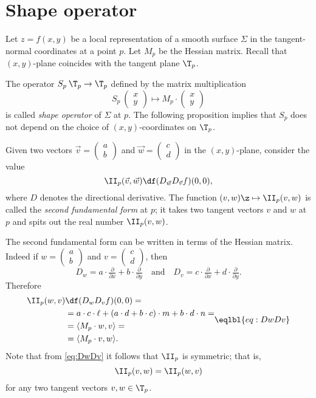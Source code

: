 \section*{Shape operator}

Let $z=f(x,y)$ be a local representation of a smooth surface $\Sigma$ in the tangent-normal coordinates at a point $p$.
Let $M_p$ be the Hessian matrix.
Recall that $(x,y)$-plane coincides with the tangent plane $\T_p$.

The operator $S_p\:\T_p\to \T_p$ defined by the matrix multiplication
\[S_p\:(\begin{smallmatrix}
x\\y
\end{smallmatrix})
\mapsto
M_p\cdot(\begin{smallmatrix}
x\\y
\end{smallmatrix})\] is called \emph{shape operator} of $\Sigma$ at $p$.
The following proposition implies that $S_p$ does not depend on the choice of $(x,y)$-coordinates on $\T_p$.





Given two vectors $\vec v=(\begin{smallmatrix}a\\b
\end{smallmatrix})$ and $\vec w=(\begin{smallmatrix}c\\d
\end{smallmatrix})$ in the $(x,y)$-plane, consider the value 
\[\II_p(\vec v,\vec w)\df(D_{\vec w}D_{\vec v}f)(0,0),\]
where $D$ denotes the directional derivative.
The function $(v,w)\z\mapsto \II_p(v,w)$ is called the \emph{second fundamental form} at $p$;\label{page:second fundamental form}
it takes two tangent vectors $v$ and $w$ at $p$ and spits out the real number $\II_p(v,w)$.

The second fundamental form can be written in terms of the Hessian matrix.
Indeed if 
$w=(\begin{smallmatrix}a\\b
\end{smallmatrix})$ 
and 
$v=(\begin{smallmatrix}c\\d
\end{smallmatrix})$, then 
\[D_w=a\cdot \tfrac\partial{\partial x}+b\cdot \tfrac\partial{\partial y}\quad\text{and}\quad D_v=c\cdot \tfrac\partial{\partial x}+d\cdot \tfrac\partial{\partial y}.\]
Therefore 
\[\begin{aligned}
\II_p(w,v)&\df(D_wD_vf)(0,0)=
\\
&=a\cdot c\cdot \ell+(a\cdot d+ b\cdot c)\cdot m +b\cdot d\cdot n=
\\
&=\langle M_p\cdot w,v\rangle=
\\
&=\langle M_p\cdot v,w\rangle.
\end{aligned}
\eqlbl{eq:DwDv}\]
Note that from \ref{eq:DwDv} it follows that $\II_p$ is symmetric; that is,
\[\II_p(v,w)=\II_p(w,v)\]
for any two tangent vectors $v,w\in \T_p$.





